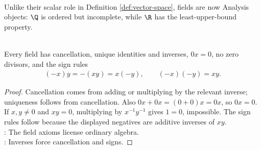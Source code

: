 \begin{remark} \label{rem:fields-as-analysis-objects-and-linear-scalars} \\
Unlike their scalar role in Definition \ref{def:vector-space}, fields are now Analysis objects: $\Q$ is ordered but incomplete, while $\R$ has the least-upper-bound property.
\end{remark}

\begin{proposition} \label{prop:field-axiom-consequences-analysis} \\
Every field has cancellation, unique identities and inverses, $0x=0$, no zero divisors, and the sign rules
\begin{align}
(-x)y=-(xy)=x(-y),\qquad (-x)(-y)=xy. \nonumber
\end{align}
\begin{proof}
Cancellation comes from adding or multiplying by the relevant inverse; uniqueness follows from cancellation. Also $0x+0x=(0+0)x=0x$, so $0x=0$. If $x,y\neq0$ and $xy=0$, multiplying by $x^{-1}y^{-1}$ gives $1=0$, impossible. The sign rules follow because the displayed negatives are additive inverses of $xy$.\\
: The field axioms license ordinary algebra.\\
: Inverses force cancellation and signs.
\end{proof}
\end{proposition}


